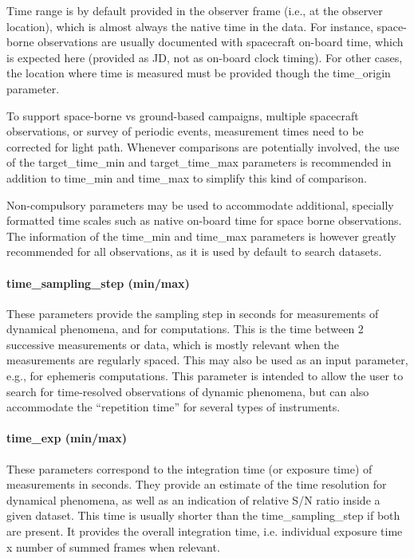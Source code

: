 \documentclass[11pt,a4paper]{ivoa}
\begin{document}
Time range is by default provided in the observer frame (i.e., at the observer location), which is almost always the native time in the data. For instance, space-borne observations are usually documented with spacecraft on-board time, which is expected here (provided as JD, not as on-board clock timing). For other cases, the location where time is measured must be provided though the time\_origin parameter.

To support space-borne vs ground-based campaigns, multiple spacecraft observations, or survey of periodic events, measurement times need to be corrected for light path. Whenever comparisons are potentially involved, the use of the target\_time\_min and target\_time\_max parameters is recommended in addition to time\_min and time\_max to simplify this kind of comparison.

Non-compulsory parameters may be used to accommodate additional, specially formatted time scales such as native on-board time for space borne observations. The information of the time\_min and time\_max parameters is however greatly recommended for all observations, as it is used by default to search datasets.

\paragraph{time\_sampling\_step (min/max)}

These parameters provide the sampling step in seconds for measurements of dynamical phenomena, and for computations. This is the time between 2 successive measurements or data, which is mostly relevant when the measurements are regularly spaced. This may also be used as an input parameter, e.g., for ephemeris computations. This parameter is intended to allow the user to search for time-resolved observations of dynamic phenomena, but can also accommodate the ``repetition time'' for several types of instruments.

\paragraph{time\_exp (min/max)}

These parameters correspond to the integration time (or exposure time) of measurements in seconds. They provide an estimate of the time resolution for dynamical phenomena, as well as an indication of relative S/N ratio inside a given dataset. This time is usually shorter than the time\_sampling\_step if both are present. It provides the overall integration time, i.e. individual exposure time x number of summed frames when relevant. 
\end{document}
